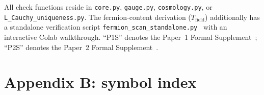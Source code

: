 \documentclass[11pt]{article}
\begin{document}
All check functions reside in \texttt{core.py}, \texttt{gauge.py}, \texttt{cosmology.py}, or \texttt{L\_Cauchy\_uniqueness.py}.  The fermion-content derivation ($T_{\mathrm{field}}$) additionally has a standalone verification script \texttt{fermion\_scan\_standalone.py}~\cite{BrookeFermionScan} with an interactive Colab walkthrough.  ``P1S'' denotes the Paper~1 Formal Supplement~\cite{BrookeSupplement}; ``P2S'' denotes the Paper~2 Formal Supplement~\cite{BrookeP2Supplement}.


\section{Appendix B: symbol index}
\label{app:symbols}
\end{document}
